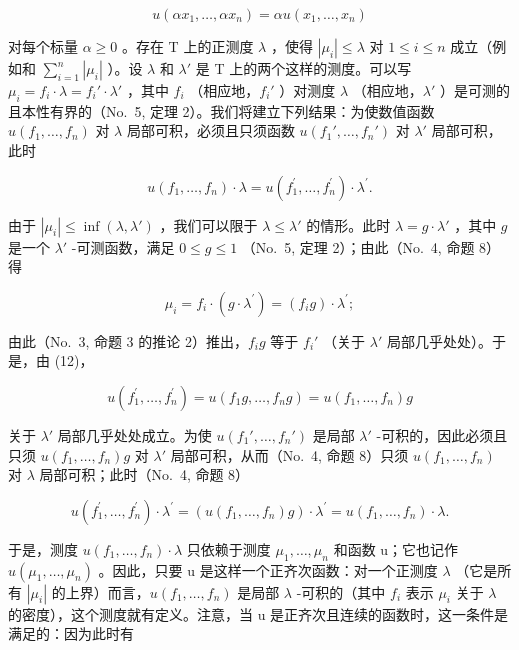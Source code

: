 \[
u (\alpha x _ {1}, \ldots , \alpha x _ {n}) = \alpha u (x _ {1}, \ldots , x _ {n})\tag{12}
\]

对每个标量 \(\alpha \geqslant 0\) 。存在 T 上的正测度 \(\lambda\) ，使得 \(|\mu_i| \leqslant \lambda\) 对 \(1 \leqslant i \leqslant n\) 成立（例如和 \(\sum_{i=1}^{n} |\mu_i|\) ）。设 \(\lambda\) 和 \(\lambda'\) 是 T 上的两个这样的测度。可以写 \(\mu_i = f_i \cdot \lambda = f_i' \cdot \lambda'\) ，其中 \(f_i\) （相应地，\(f_i'\) ）对测度 \(\lambda\) （相应地，\(\lambda'\) ）是可测的且本性有界的（No.~5, 定理 2）。我们将建立下列结果：为使数值函数 \(u(f_1, \ldots, f_n)\) 对 \(\lambda\) 局部可积，必须且只须函数 \(u(f_1', \ldots, f_n')\) 对 \(\lambda'\) 局部可积，此时

\[
u (f _ {1}, \dots , f _ {n}) \cdot \lambda = u (f _ {1} ^ {\prime}, \dots , f _ {n} ^ {\prime}) \cdot \lambda^ {\prime}.
\]

由于 \(|\mu_i| \leqslant \inf(\lambda, \lambda')\) ，我们可以限于 \(\lambda \leqslant \lambda'\) 的情形。此时 \(\lambda = g \cdot \lambda'\) ，其中 \(g\) 是一个 \(\lambda'\) -可测函数，满足 \(0 \leqslant g \leqslant 1\) （No.~5, 定理 2）；由此（No.~4, 命题 8）得

\[
\mu_ {i} = f _ {i} \cdot (g \cdot \lambda^ {\prime}) = (f _ {i} g) \cdot \lambda^ {\prime};
\]

由此（No.~3, 命题 3 的推论 2）推出，\(f_{i}g\) 等于 \(f_{i}'\) （关于 \(\lambda'\) 局部几乎处处）。于是，由 (12)，

\[
u (f _ {1} ^ {\prime}, \dots , f _ {n} ^ {\prime}) = u (f _ {1} g, \dots , f _ {n} g) = u (f _ {1}, \dots , f _ {n}) g
\]

关于 \(\lambda'\) 局部几乎处处成立。为使 \(u(f_1', \ldots, f_n')\) 是局部 \(\lambda'\) -可积的，因此必须且只须 \(u(f_1, \ldots, f_n)g\) 对 \(\lambda'\) 局部可积，从而（No.~4, 命题 8）只须 \(u(f_1, \ldots, f_n)\) 对 \(\lambda\) 局部可积；此时（No.~4, 命题 8）

\[
u \left(f _ {1} ^ {\prime}, \dots , f _ {n} ^ {\prime}\right) \cdot \lambda^ {\prime} = \left(u \left(f _ {1}, \dots , f _ {n}\right) g\right) \cdot \lambda^ {\prime} = u \left(f _ {1}, \dots , f _ {n}\right) \cdot \lambda .
\]

于是，测度 \(u(f_{1},\ldots,f_{n})\cdot\lambda\) 只依赖于测度 \(\mu_{1},\ldots,\mu_{n}\) 和函数 u；它也记作 \(u(\mu_{1},\ldots,\mu_{n})\) 。因此，只要 u 是这样一个正齐次函数：对一个正测度 \(\lambda\) （它是所有 \(|\mu_{i}|\) 的上界）而言，\(u(f_{1},\ldots,f_{n})\) 是局部 \(\lambda\) -可积的（其中 \(f_{i}\) 表示 \(\mu_{i}\) 关于 \(\lambda\) 的密度），这个测度就有定义。注意，当 u 是正齐次且连续的函数时，这一条件是满足的：因为此时有

